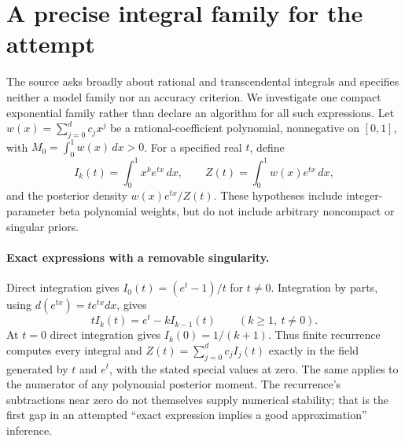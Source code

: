 \documentclass[11pt]{article}
\begin{document}
\section{A precise integral family for the attempt}
The source asks broadly about rational and transcendental integrals and
specifies neither a model family nor an accuracy criterion. We investigate
one compact exponential family rather than declare an algorithm for all
such expressions. Let $w(x)=\sum_{j=0}^d c_jx^j$ be a rational-coefficient
polynomial, nonnegative on $[0,1]$, with
$M_0=\int_0^1w(x)\,dx>0$. For a specified real $t$, define
\[
I_k(t)=\int_0^1x^k e^{tx}\,dx,\qquad
Z(t)=\int_0^1w(x)e^{tx}\,dx,
\]
and the posterior density $w(x)e^{tx}/Z(t)$. These hypotheses include
integer-parameter beta polynomial weights, but do not include arbitrary
noncompact or singular priors.

\paragraph{Exact expressions with a removable singularity.}
Direct integration gives $I_0(t)=(e^t-1)/t$ for $t\ne0$.
Integration by parts, using $d(e^{tx})=te^{tx}dx$, gives
\[
 t I_k(t)=e^t-k I_{k-1}(t)\qquad(k\ge1,\ t\ne0).
\]
At $t=0$ direct integration gives $I_k(0)=1/(k+1)$.
Thus finite recurrence computes every integral and
$Z(t)=\sum_{j=0}^d c_jI_j(t)$ exactly in the field generated by
$t$ and $e^t$, with the stated special values at zero. The same applies
to the numerator of any polynomial posterior moment. The recurrence's
subtractions near zero do not themselves supply numerical stability;
that is the first gap in an attempted ``exact expression implies a good
approximation'' inference.
\end{document}
